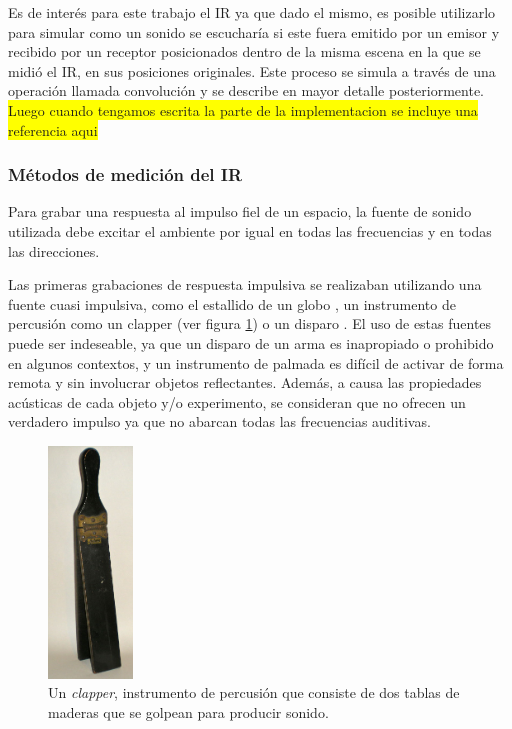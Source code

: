 \documentclass{prgrado}
\begin{document}
Es de interés para este trabajo el IR ya que dado el mismo, es posible utilizarlo para simular como un sonido se escucharía si este fuera emitido por un emisor y recibido por un receptor posicionados dentro de la misma escena en la que se midió el IR, en sus posiciones originales. Este proceso se simula a través de una operación llamada convolución y se describe en mayor detalle posteriormente. \colorbox{yellow}{Luego cuando tengamos escrita la parte de la implementacion se incluye una referencia aqui}

\subsubsection{Métodos de medición del IR}

Para grabar una respuesta al impulso fiel de un espacio, la fuente de sonido utilizada debe excitar el ambiente por igual en todas las frecuencias y en todas las direcciones.

Las primeras grabaciones de respuesta impulsiva se realizaban utilizando una fuente cuasi impulsiva, como el estallido de un globo \cite{Balloon}, un instrumento de percusión como un clapper (ver figura \ref{fig:clapper}) o un disparo \cite{York}. El uso de estas fuentes puede ser indeseable, ya que un disparo de un arma es inapropiado o prohibido en algunos contextos, y un instrumento de palmada es difícil de activar de forma remota y sin involucrar objetos reflectantes. Además, a causa las propiedades acústicas de cada objeto y/o experimento, se consideran que no ofrecen un verdadero impulso ya que no abarcan todas las frecuencias auditivas.

\begin{figure}
    \centering
    \includegraphics[width=0.2\textwidth]{figs/clapper.png}
    \captionsetup{justification=centering}
    \caption{Un \textit{clapper}, instrumento de percusión que consiste de dos tablas de maderas que se golpean para producir sonido.}
    \label{fig:clapper}
\end{figure}
\end{document}
